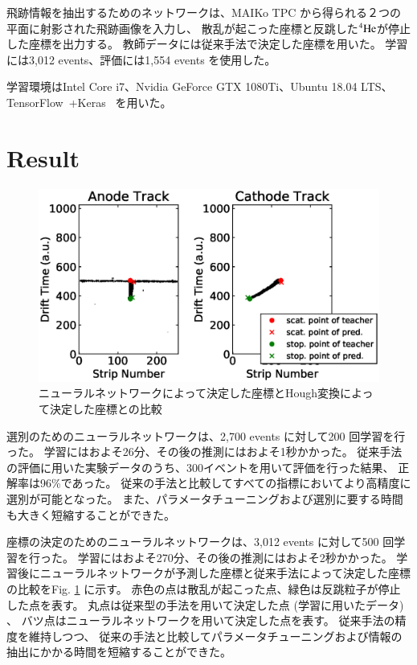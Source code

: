 \documentclass{jps-cp}
\begin{document}
飛跡情報を抽出するためのネットワークは、MAIKo TPC から得られる２つの平面に射影された飛跡画像を入力し、
散乱が起こった座標と反跳した${}^{4}\rm{He}$が停止した座標を出力する。
教師データには従来手法で決定した座標を用いた。
学習には3,012 events、評価には1,554 events を使用した。

学習環境はIntel Core i7、Nvidia GeForce GTX 1080Ti、Ubuntu 18.04 LTS、
TensorFlow~\cite{tensorflow}+Keras~\cite{keras} を用いた。

\section{Result}
\begin{figure}
  \vspace{-4zw}
  \centering
  \includegraphics[clip, width=25zw]{eps/point_detection_compair.eps}
  \caption{ニューラルネットワークによって決定した座標とHough変換によって決定した座標との比較}
  \label{fig:result_detection}
\end{figure}

選別のためのニューラルネットワークは、2,700 events に対して200 回学習を行った。
学習にはおよそ26分、その後の推測にはおよそ1秒かかった。
従来手法の評価に用いた実験データのうち、300イベントを用いて評価を行った結果、
正解率は96\%であった。
従来の手法と比較してすべての指標においてより高精度に選別が可能となった。
また、パラメータチューニングおよび選別に要する時間も大きく短縮することができた。

座標の決定のためのニューラルネットワークは、3,012 events に対して500 回学習を行った。
学習にはおよそ270分、その後の推測にはおよそ2秒かかった。
学習後にニューラルネットワークが予測した座標と従来手法によって決定した座標の比較をFig. \ref{fig:result_detection} に示す。
赤色の点は散乱が起こった点、緑色は反跳粒子が停止した点を表す。
丸点は従来型の手法を用いて決定した点 (学習に用いたデータ) 、
バツ点はニューラルネットワークを用いて決定した点を表す。
従来手法の精度を維持しつつ、
従来の手法と比較してパラメータチューニングおよび情報の抽出にかかる時間を短縮することができた。
\end{document}
